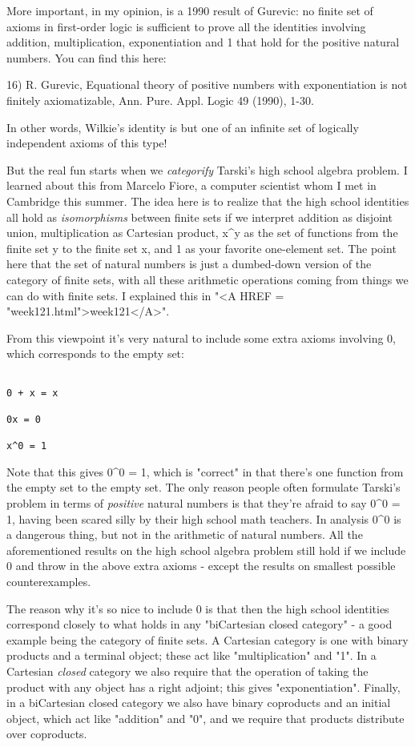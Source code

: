 More important, in my opinion, is a 1990 result of Gurevic: no finite
set of axioms in first-order logic is sufficient to prove all the 
identities involving addition, multiplication, exponentiation and 1 
that hold for the positive natural numbers.  You can find this here:

16) R. Gurevic, Equational theory of positive numbers with exponentiation
is not finitely axiomatizable, Ann. Pure. Appl. Logic 49 (1990), 1-30.

In other words, Wilkie's identity is but one of an infinite set of
logically independent axioms of this type!

But the real fun starts when we \emph{categorify} Tarski's high school
algebra problem.  I learned about this from Marcelo Fiore, a computer
scientist whom I met in Cambridge this summer.  The idea here is to
realize that the high school identities all hold as
\emph{isomorphisms} between finite sets if we interpret addition as
disjoint union, multiplication as Cartesian product, x^y as the set of
functions from the finite set y to the finite set x, and 1 as your
favorite one-element set.  The point here that the set of natural
numbers is just a dumbed-down version of the category of finite sets,
with all these arithmetic operations coming from things we can do with
finite sets.  I explained this in "<A HREF =
"week121.html">week121</A>".

From this viewpoint it's very natural to include some extra axioms
involving 0, which corresponds to the empty set: 


\begin{verbatim}

0 + x = x        

0x = 0     

x^0 = 1
\end{verbatim}
    
Note that this gives 0^0 = 1, which is "correct" in that there's one
function from the empty set to the empty set.  The only reason people
often formulate Tarski's problem in terms of \emph{positive} natural numbers
is that they're afraid to say 0^0 = 1, having been scared silly by their
high school math teachers.  In analysis 0^0 is a dangerous thing, but
not in the arithmetic of natural numbers.  All the aforementioned
results on the high school algebra problem still hold if we include 0
and throw in the above extra axioms - except the results on smallest
possible counterexamples.

The reason why it's so nice to include 0 is that then the high school
identities correspond closely to what holds in any "biCartesian
closed category" - a good example being the category of finite
sets.  A Cartesian category is one with binary products and a terminal
object; these act like "multiplication" and "1".  In
a Cartesian \emph{closed} category we also require that the operation
of taking the product with any object has a right adjoint; this gives
"exponentiation".  Finally, in a biCartesian closed category
we also have binary coproducts and an initial object, which act like
"addition" and "0", and we require that products
distribute over coproducts.

